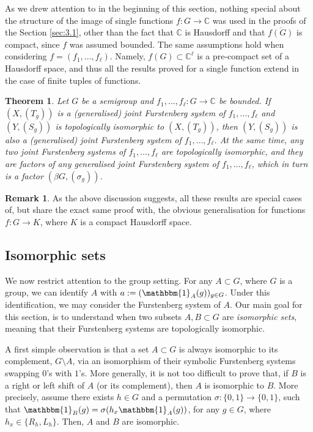 \documentclass{amsart}
\numberwithin{equation}{section}
\newtheorem{theorem}[lemma]{Theorem}
\theoremstyle{definition}
\newtheorem*{remark*}{Remark}
\theoremstyle{plain}
\newcommand{\C}{{\mathbb C}}
\begin{document}
As we drew attention to in the beginning of this section, nothing special 
about the structure of the image of single functions $f:G\to \C$ was used 
in the proofs of the Section \ref{sec:3.1}, other than the fact that
$\C$ is
Hausdorff and that $\overline{f(G)}$ is compact, since $f$ was assumed bounded. The same assumptions hold when considering $f=(f_1,\ldots,f_{\ell})$. Namely, $f(G)\subset \C^{\ell}$ is a pre-compact set of a Hausdorff space, and thus all the results proved for a single function extend in the case of finite tuples of functions.  

\begin{theorem}\label{joint FS results}
Let $G$ be a semigroup and $f_1,\ldots,f_{\ell}:G\to \C$ be bounded. If $(X,(T_g))$ is a 
(generalised) joint Furstenberg system of $f_1,\ldots,f_{\ell}$ 
and $(Y,(S_g))$ is topologically 
isomorphic to $(X,(T_g))$, then $(Y,(S_g))$ 
is also a (generalised) joint 
Furstenberg system of $f_1,\ldots,f_{\ell}$. At the same time, any two 
joint Furstenberg systems of $f_1,\ldots,f_{\ell}$
are topologically isomorphic, and they are factors of any generalised joint 
Furstenberg system of $f_1,\ldots,f_{\ell}$, which in turn is a factor 
$(\beta G, (\sigma_g))$.   
\end{theorem}

\begin{remark*}
As the above discussion suggests, all these results are 
special cases of,
but share the exact same proof with, the obvious 
generalisation for functions $f:G\to K$, where $K$ is a 
compact Hausdorff space. 
\end{remark*}

\subsection{Isomorphic sets}\label{isomorphic subsection} 

We now restrict attention to the group setting. 
For any $A \subset G$, where $G$ is a group, we can identify $A$ with 
$a := (\mathbbm{1}_A(g))_{g \in G}$.  
Under this identification, we may consider the Furstenberg system of $A$. Our main goal for this section, is to understand when two subsets $A, B \subset G$ are \emph{isomorphic sets}, meaning that their Furstenberg systems are topologically isomorphic.

A first simple observation is that a set $A \subset G$ is
always isomorphic to its complement, $G \setminus A$, via 
an isomorphism of their symbolic Furstenberg systems 
swapping $0$'s with $1$'s. More generally, it is not too
difficult to prove that, if $B$ is a right or 
left shift of $A$ (or its complement), then $A$ is 
isomorphic to $B$. More precisely, assume there exists $h\in G$ and a permutation $\sigma:\{0,1\}\to \{0,1\}$, such that $\mathbbm{1}_{B}(g)=\sigma(h_x \mathbbm{1}_{A}(g))$, for any $g\in G$, where $h_x\in \{R_h,L_h\}$. Then, $A$ and $B$ are isomorphic.
\end{document}

